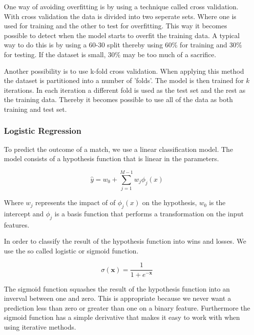One way of avoiding overfitting is by using a technique called cross validation.
With cross validation the data is divided into two seperate sets.
Where one is used for training and the other to test for overfitting. 
This way it becomes possible to detect when the model starts to overfit the training data.
A typical way to do this is by using a 60-30 split thereby using 60\% for training and 30\% for testing.
If the dataset is small, 30\% may be too much of a sacrifice.

Another possibility is to use k-fold cross validation.
When applying this method the dataset is partitioned into a number of 'folds'.
The model is then trained for $k$ iterations.
In each iteration a different fold is used as the test set and the rest as the training data.
Thereby it becomes possible to use all of the data as both training and test set.
\begin{flushright}
\cite[p. 324]{AI2010}
\end{flushright}

\subsubsection{Logistic Regression}\label{sec:logistic}
To predict the outcome of a match, we use a linear classification model.
The model consists of a hypothesis function that is linear in the parameters.

\[ \hat{y} = w_0 + \sum_{j=1}^{M-1} w_j \phi_j(x) \]

Where $w_j$ represents the impact of of $\phi_j(x)$ on the hypothesis,
$w_0$ is the intercept and $\phi_j$ is a basis function that
performs a transformation on the input features. 


In order to classify the result of the hypothesis function into wins and losses. 
We use the so called logistic or sigmoid function.

\[ \sigma(\textbf{x}) = \frac{1}{1+e^{- \textbf{x}}} \]

The sigmoid function squashes the result of the hypothesis function into an inverval between one and zero.
This is appropriate because we never want a prediction less than zero or greater than one on a binary feature.
Furthermore the sigmoid function has a simple derivative that makes it easy to work with when using iterative methods.

